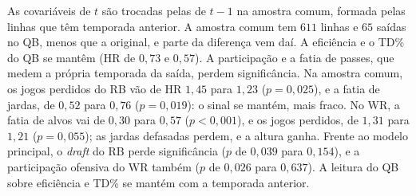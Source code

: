 As covariáveis de $t$ são trocadas pelas de $t-1$ na amostra comum, formada pelas linhas que têm temporada anterior. A amostra comum tem $611$ linhas e $65$ saídas no QB, menos que a original, e parte da diferença vem daí. A eficiência e o TD\% do QB se mantêm (HR de $0{,}73$ e $0{,}57$). A participação e a fatia de passes, que medem a própria temporada da saída, perdem significância. Na amostra comum, os jogos perdidos do RB vão de HR $1{,}45$ para $1{,}23$ ($p=0{,}025$), e a fatia de jardas, de $0{,}52$ para $0{,}76$ ($p=0{,}019$): o sinal se mantém, mais fraco. No WR, a fatia de alvos vai de $0{,}30$ para $0{,}57$ ($p<0{,}001$), e os jogos perdidos, de $1{,}31$ para $1{,}21$ ($p=0{,}055$); as jardas defasadas perdem, e a altura ganha. Frente ao modelo principal, o \textit{draft} do RB perde significância ($p$ de $0{,}039$ para $0{,}154$), e a participação ofensiva do WR também ($p$ de $0{,}026$ para $0{,}637$). A leitura do QB sobre eficiência e TD\% se mantém com a temporada anterior.
